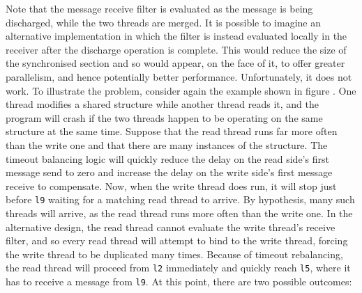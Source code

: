 Note that the message receive filter is evaluated as the message is being discharged, while the two threads are merged.
It is possible to imagine an alternative implementation in which the filter is instead evaluated locally in the receiver after the discharge operation is complete.
This would reduce the size of the synchronised section and so would appear, on the face of it, to offer greater parallelism, and hence potentially better performance.
Unfortunately, it does not work.
To illustrate the problem, consider again the example shown in figure .
One thread modifies a shared structure while another thread reads it, and the program will crash if the two threads happen to be operating on the same structure at the same time.
Suppose that the read thread runs far more often than the write one and that there are many instances of the structure.
The timeout balancing logic will quickly reduce the delay on the read side's first message send to zero and increase the delay on the write side's first message receive to compensate.
Now, when the write thread does run, it will stop just before \verb|l9| waiting for a matching read thread to arrive.
By hypothesis, many such threads will arrive, as the read thread runs more often than the write one.
In the alternative design, the read thread cannot evaluate the write thread's receive filter, and so every read thread will attempt to bind to the write thread, forcing the write thread to be duplicated many times.
Because of timeout rebalancing, the read thread will proceed from \verb|l2| immediately and quickly reach \verb|l5|, where it has to receive a message from \verb|l9|.
At this point, there are two possible outcomes:

